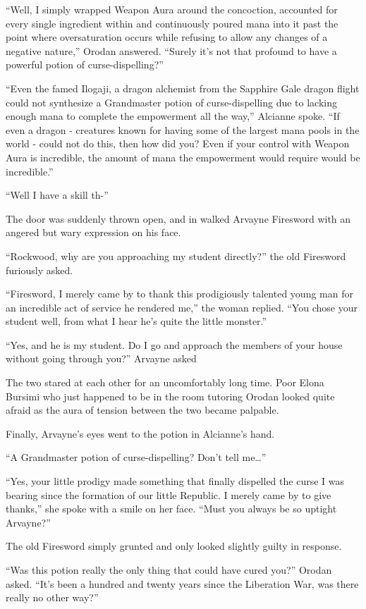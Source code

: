 \documentclass[a4paper,10pt]{book}
\begin{document}
“Well, I simply wrapped Weapon Aura around the concoction, accounted for every single ingredient within and continuously poured mana into it past the point where oversaturation occurs while refusing to allow any changes of a negative nature,” Orodan answered. “Surely it’s not that profound to have a powerful potion of curse-dispelling?”\par
“Even the famed Ilogaji, a dragon alchemist from the Sapphire Gale dragon flight could not synthesize a Grandmaster potion of curse-dispelling due to lacking enough mana to complete the empowerment all the way,” Alcianne spoke. “If even a dragon - creatures known for having some of the largest mana pools in the world - could not do this, then how did you? Even if your control with Weapon Aura is incredible, the amount of mana the empowerment would require would be incredible.”\par
“Well I have a skill th-”\par
The door was suddenly thrown open, and in walked Arvayne Firesword with an angered but wary expression on his face.\par
“Rockwood, why are you approaching my student directly?” the old Firesword furiously asked.\par
“Firesword, I merely came by to thank this prodigiously talented young man for an incredible act of service he rendered me,” the woman replied. “You chose your student well, from what I hear he’s quite the little monster.”\par
“Yes, and he is my student. Do I go and approach the members of your house without going through you?” Arvayne asked\par
The two stared at each other for an uncomfortably long time. Poor Elona Bursimi who just happened to be in the room tutoring Orodan looked quite afraid as the aura of tension between the two became palpable.\par
Finally, Arvayne’s eyes went to the potion in Alcianne’s hand.\par
“A Grandmaster potion of curse-dispelling? Don’t tell me…”\par
“Yes, your little prodigy made something that finally dispelled the curse I was bearing since the formation of our little Republic. I merely came by to give thanks,” she spoke with a smile on her face. “Must you always be so uptight Arvayne?”\par
The old Firesword simply grunted and only looked slightly guilty in response.\par
“Was this potion really the only thing that could have cured you?” Orodan asked. “It’s been a hundred and twenty years since the Liberation War, was there really no other way?”\par
\end{document}
